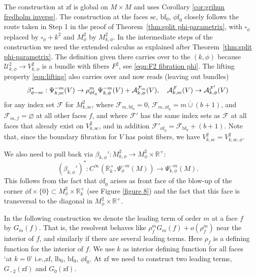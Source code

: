 \documentclass[11pt]{article}
\newcommand{\ie}{i.e.,\xspace}
\numberwithin{equation}{section}
\newcommand{\phisc}{{\phi\textup{-}\ssc}}
\theoremstyle{plain}
\theoremstyle{definition}
\newcommand{\R}{{\mathbb{R}}}
\newcommand{\Umath}{{\mathscr{U}}}
\newcommand\calA{{\mathcal A}}
\newcommand\calF{{\mathcal F}}
\newcommand{\phif}{{\phi\mathrm{f}}}
\newcommand{\lf}{{\mathrm{lb}}}
\newcommand{\bbf}{{\mathrm{bf}}}
\newcommand{\ssc}{{\mathrm{sc}}}
\newcommand{\zf}{{\mathrm{zf}}}
\newcommand{\ocup}{\mathbin{\overline{\cup}}}
\begin{document}
The construction at $\zf$ is global on $M\times M$ and uses Corollary \ref{cor:grihun fredholm inverse}. The construction at the faces $\ssc$, $\bbf_0$, $\phif_0$ closely follows the route taken in Step 1 in the proof of Theorem~\ref{thm:split phi-parametrix}, with $\square_\phi$ replaced by $\square_\phi+k^2$ and $M^2_\phi$ by $M^2_{k,\phi}$.
In the intermediate steps of the construction we need the extended calculus as explained after Theorem~\ref{thm:split phi-parametrix}. The definition given there carries over to the $(k,\phi)$ because $\Umath^2_{k,\phi}\to V^2_{k,\phi}$ is a bundle with fibers $F^2$, see \eqref{eqn:F2 fibration phi}. The lifting property \eqref{eqn:lifting} also carries over and now reads (leaving out bundles)
\begin{equation}
\label{eqn:lifting k phi}
\beta_{\phisc}^*: \Psi_{k,\ssc}^{-m}(V) \to \rho_{\phif_0}^m\Psi_{k,\phi}^{-m}(V)+\calA_{k,\phi}^{\calF_m}(V),
\quad \calA_{k,\ssc}^{\calF}(V) \to \calA_{k,\phi}^{\calF'}(V)
\end{equation}
for any index set $\calF$ for $M^2_{k,\ssc}$,
where $\calF_{m,\bbf_0}=0$, $\calF_{m,{\phif_0}}=m \ocup (b+1)$, and
$\calF_{m,f}=\varnothing$ at all other faces $f$, and where $\calF'$ has the same index sets as
$\calF$ at all faces that already exist on $V^2_{k,\ssc}$, and in addition $\calF'_{\phif_0} = \calF_{\bbf_0}+(b+1)$. Note that, since the boundary fibration for $V$ has point fibers, we have $V^2_{k,\ssc}= V^2_{k,\ssc,\phi}$.

We also need to pull back via $\beta_{k,\phi}':M^2_{k,\phi}\to M^2_\phi \times \R^+$:
\begin{equation}
\label{eqn:lifting k phi2}
(\beta_{k,\phi}')^*: C^\infty(\R^{+}_{k},\Psi^{-m}_\phi(M)) \to \Psi^{-m}_{k,\phi}(M).
\end{equation}
This follows from the fact that $\phif_0$ arises as front face of the blow-up of the corner
$\phif\times\{0\}\subset M^2_\phi\times\R^{+}_{k}$ (see Figure \ref{figure 8}) and the fact that this face is transversal to the diagonal in $M^2_\phi\times\R^+$.

In the following construction we denote the leading term of order $m$ at a face $f$ by $G_m(f)$. That is, the resolvent behaves like $\rho_f^m G_m(f) + o(\rho_f^m)$ near the interior of $f$, and similarly if there are several leading terms. Here $\rho_f$ is a defining function for the interior of $f$. We use $k$ as interior defining function for all faces `at $k=0$' \ie $\zf$, $\lf_0$, $\bbf_0$, $\phif_0$.
At $\zf$ we need to construct two leading terms, $G_{-2}(\zf)$ and $G_0(\zf)$.
\end{document}
